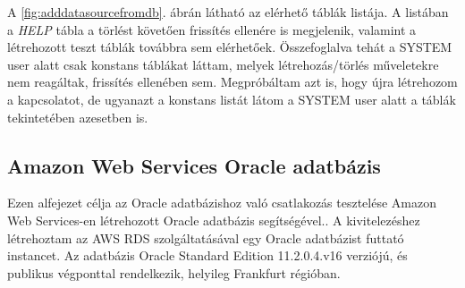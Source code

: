 A \ref{fig:adddatasourcefromdb}. ábrán látható az elérhető táblák listája. A listában a \textit{HELP} tábla a törlést követően frissítés ellenére is megjelenik, valamint a létrehozott teszt táblák továbbra sem elérhetőek. Összefoglalva tehát a SYSTEM user alatt csak konstans táblákat láttam, melyek létrehozás/törlés műveletekre nem reagáltak, frissítés ellenében sem. Megpróbáltam azt is, hogy újra létrehozom a kapcsolatot, de ugyanazt a konstans listát látom a SYSTEM user alatt a táblák tekintetében azesetben is.
\subsection{Amazon Web Services Oracle adatbázis}
Ezen alfejezet célja az Oracle adatbázishoz való csatlakozás tesztelése Amazon Web Services-en létrehozott Oracle adatbázis segítségével.. A kivitelezéshez létrehoztam az AWS RDS szolgáltatásával egy Oracle adatbázist futtató instancet. Az adatbázis Oracle Standard Edition 11.2.0.4.v16 verziójú, és publikus végponttal rendelkezik, helyileg Frankfurt régióban.

